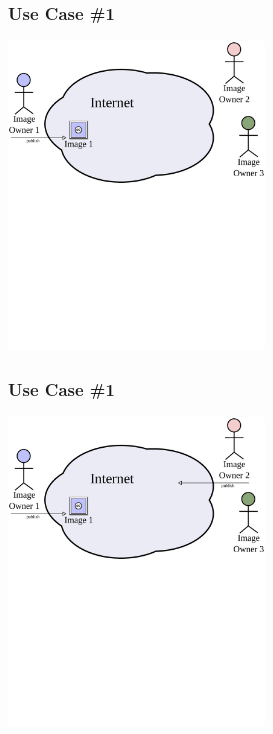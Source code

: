 \documentclass[mathserif,xcolor=dvipsnames,hyperref={bookmarks=true}]{beamer}
\begin{document}
    \begin{frame}[t]
        \frametitle{Use Case \#1}
        \begin{center}
            \includegraphics[width=0.51\textwidth]{../resources/usecases/usecase1/usecase1-step06.pdf}
        \end{center}
    \end{frame}
    \begin{frame}[t]
        \frametitle{Use Case \#1}
        \begin{center}
            \includegraphics[width=0.51\textwidth]{../resources/usecases/usecase1/usecase1-step07.pdf}
        \end{center}
    \end{frame}
\end{document}
